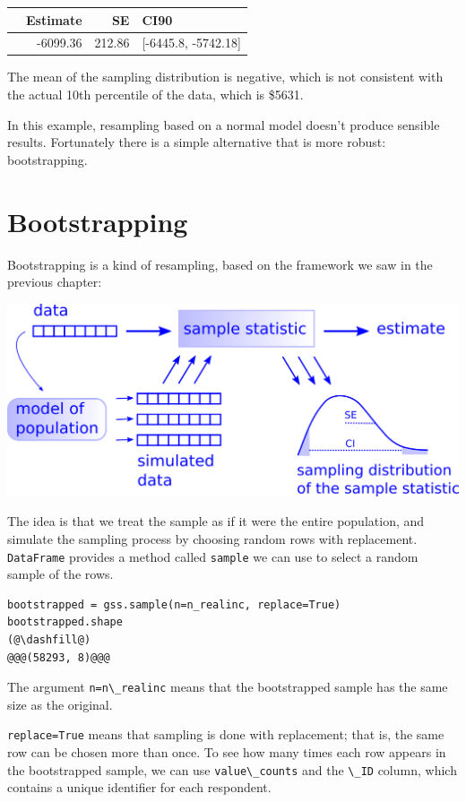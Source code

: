 \begin{tabular}{lrrl}
\midrule
{} &  Estimate &      SE &                 CI90 \\
\midrule
{} &  -6099.36 &  212.86 &  [-6445.8, -5742.18] \\
\midrule
\end{tabular}

The mean of the sampling distribution is negative, which is not
consistent with the actual 10th percentile of the data, which is \$5631.

In this example, resampling based on a normal model doesn't produce
sensible results. Fortunately there is a simple alternative that is more
robust: bootstrapping.

\hypertarget{bootstrapping}{%
\section{Bootstrapping}\label{bootstrapping}}

Bootstrapping is a kind of resampling, based on the framework we saw in
the previous chapter:

\includegraphics{figs/resampling.png}

The idea is that we treat the sample as if it were the entire
population, and simulate the sampling process by choosing random rows
with replacement. \passthrough{\lstinline!DataFrame!} provides a method
called \passthrough{\lstinline!sample!} we can use to select a random
sample of the rows.

\begin{lstlisting}[]
bootstrapped = gss.sample(n=n_realinc, replace=True)
bootstrapped.shape
(@\dashfill@)
@@@(58293, 8)@@@
\end{lstlisting}

The argument \passthrough{\lstinline!n=n\_realinc!} means that the
bootstrapped sample has the same size as the original.

\passthrough{\lstinline!replace=True!} means that sampling is done with
replacement; that is, the same row can be chosen more than once. To see
how many times each row appears in the bootstrapped sample, we can use
\passthrough{\lstinline!value\_counts!} and the
\passthrough{\lstinline!\_ID!} column, which contains a unique
identifier for each respondent.

